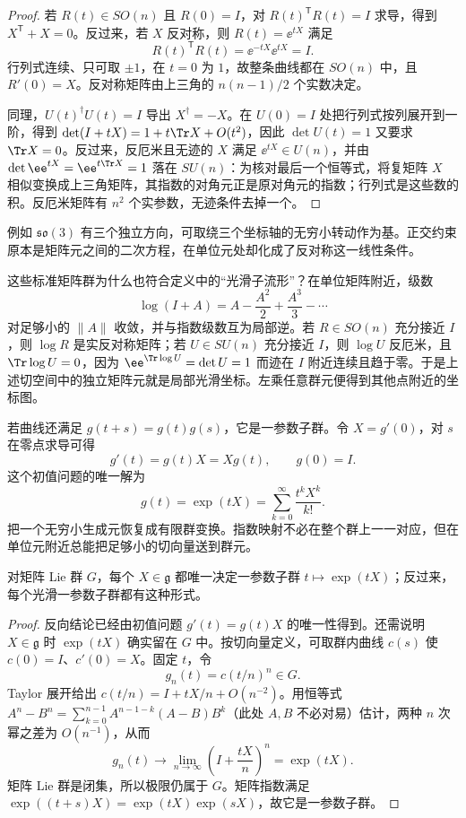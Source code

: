 \begin{proof}
若 $R(t)\in SO(n)$ 且 $R(0)=I$，对 $R(t)^{\mathsf T}R(t)=I$ 求导，得到 $X^{\mathsf T}+X=0$。反过来，若 $X$ 反对称，则 $R(t)=\ee^{tX}$ 满足
\[
R(t)^{\mathsf T}R(t)=\ee^{-tX}\ee^{tX}=I.
\]
行列式连续、只可取 $\pm1$，在 $t=0$ 为 $1$，故整条曲线都在 $SO(n)$ 中，且 $R'(0)=X$。反对称矩阵由上三角的 $n(n-1)/2$ 个实数决定。

同理，$U(t)^\dagger U(t)=I$ 导出 $X^\dagger=-X$。在 $U(0)=I$ 处把行列式按列展开到一阶，得到 $\det(I+tX)=1+t\Tr X+O(t^2)$，因此 $\det U(t)=1$ 又要求 $\Tr X=0$。反过来，反厄米且无迹的 $X$ 满足 $\ee^{tX}\in U(n)$，并由 $\det\ee^{tX}=\ee^{t\Tr X}=1$ 落在 $SU(n)$：为核对最后一个恒等式，将复矩阵 $X$ 相似变换成上三角矩阵，其指数的对角元正是原对角元的指数；行列式是这些数的积。反厄米矩阵有 $n^2$ 个实参数，无迹条件去掉一个。
\end{proof}

例如 $\mathfrak{so}(3)$ 有三个独立方向，可取绕三个坐标轴的无穷小转动作为基。正交约束原本是矩阵元之间的二次方程，在单位元处却化成了反对称这一线性条件。

这些标准矩阵群为什么也符合定义中的“光滑子流形”？在单位矩阵附近，级数
\[
\log(I+A)=A-\frac{A^2}{2}+\frac{A^3}{3}-\cdots
\]
对足够小的 $\|A\|$ 收敛，并与指数级数互为局部逆。若 $R\in SO(n)$ 充分接近 $I$，则 $\log R$ 是实反对称矩阵；若 $U\in SU(n)$ 充分接近 $I$，则 $\log U$ 反厄米，且 $\Tr\log U=0$，因为 $\ee^{\Tr\log U}=\det U=1$ 而迹在 $I$ 附近连续且趋于零。于是上述切空间中的独立矩阵元就是局部光滑坐标。左乘任意群元便得到其他点附近的坐标图。

若曲线还满足 $g(t+s)=g(t)g(s)$，它是一参数子群。令 $X=g'(0)$，对 $s$ 在零点求导可得
\[
g'(t)=g(t)X=Xg(t),\qquad g(0)=I.
\]
这个初值问题的唯一解为
\begin{equation}
g(t)=\exp(tX)=\sum_{k=0}^{\infty}\frac{t^kX^k}{k!}.
\label{eq:one-parameter-exponential}
\end{equation}
 把一个无穷小生成元恢复成有限群变换。指数映射不必在整个群上一一对应，但在单位元附近总能把足够小的切向量送到群元。

\begin{theorem}[一参数子群与生成元一一对应]
对矩阵 Lie 群 $G$，每个 $X\in\mathfrak g$ 都唯一决定一参数子群 $t\mapsto\exp(tX)$；反过来，每个光滑一参数子群都有这种形式。
\end{theorem}

\begin{proof}
反向结论已经由初值问题 $g'(t)=g(t)X$ 的唯一性得到。还需说明 $X\in\mathfrak g$ 时 $\exp(tX)$ 确实留在 $G$ 中。按切向量定义，可取群内曲线 $c(s)$ 使 $c(0)=I$、$c'(0)=X$。固定 $t$，令
\[
g_n(t)=c(t/n)^n\in G.
\]
Taylor 展开给出 $c(t/n)=I+tX/n+O(n^{-2})$。用恒等式 $A^n-B^n=\sum_{k=0}^{n-1}A^{n-1-k}(A-B)B^k$（此处 $A,B$ 不必对易）估计，两种 $n$ 次幂之差为 $O(n^{-1})$，从而
\[
g_n(t)\longrightarrow \lim_{n\to\infty}
\left(I+\frac{tX}{n}\right)^n=\exp(tX).
\]
矩阵 Lie 群是闭集，所以极限仍属于 $G$。矩阵指数满足
$\exp((t+s)X)=\exp(tX)\exp(sX)$，故它是一参数子群。
\end{proof}

